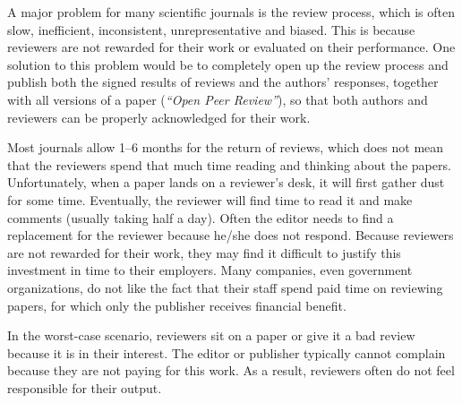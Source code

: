\documentclass[graybox,envcountchap,sectrefs,UStrade]{svmono}
\begin{document}
\begin{svgraybox}
A major problem for many scientific journals is the review process, which is often slow, inefficient, inconsistent, unrepresentative and biased. This is because reviewers are not rewarded for their work or evaluated on their performance. One solution to this problem would be to completely open up the review process and publish both the signed results of reviews and the authors' responses, together with all versions of a paper (\emph{``Open Peer Review''}), so that both authors and reviewers can be properly acknowledged for their work.
\end{svgraybox}\label{R:editors}

Most journals allow 1--6 months for the return of reviews, which does not mean that the reviewers spend that much time reading and thinking about the papers. Unfortunately, when a paper lands on a reviewer's desk, it will first gather dust for some time. Eventually, the reviewer will find time to read it and make comments (usually taking half a day). Often the editor needs to find a replacement for the reviewer because he/she does not respond. Because reviewers are not rewarded for their work, they may find it difficult to justify this investment in time to their employers. Many companies, even government organizations, do not like the fact that their staff spend paid time on reviewing papers, for which only the publisher receives financial benefit.\par

In the worst-case scenario, reviewers sit on a paper or give it a bad review because it is in their interest. The editor or publisher typically cannot complain because they are not paying for this work. As a result, reviewers often do not feel responsible for their output.\par
\end{document}

